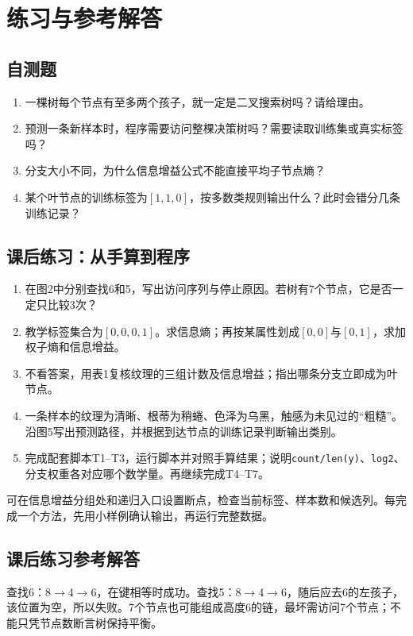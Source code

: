 \documentclass[UTF8,a4paper,11pt,fontset=fandol]{ctexart}
\numberwithin{equation}{subsection}
\begin{document}
\clearpage
\section{练习与参考解答}
\subsection{自测题}
\begin{enumerate}
\item 一棵树每个节点有至多两个孩子，就一定是二叉搜索树吗？请给理由。
\item 预测一条新样本时，程序需要访问整棵决策树吗？需要读取训练集或真实标签吗？
\item 分支大小不同，为什么信息增益公式不能直接平均子节点熵？
\item 某个叶节点的训练标签为$[1,1,0]$，按多数类规则输出什么？此时会错分几条训练记录？
\end{enumerate}

\subsection{课后练习：从手算到程序}
\begin{enumerate}
\item 在图2中分别查找6和5，写出访问序列与停止原因。若树有7个节点，它是否一定只比较3次？
\item 教学标签集合为$[0,0,0,1]$。求信息熵；再按某属性划成$[0,0]$与$[0,1]$，求加权子熵和信息增益。
\item 不看答案，用表1复核纹理的三组计数及信息增益；指出哪条分支立即成为叶节点。
\item 一条样本的纹理为清晰、根蒂为稍蜷、色泽为乌黑，触感为未见过的“粗糙”。沿图5写出预测路径，并根据到达节点的训练记录判断输出类别。
\item 完成配套脚本T1--T3，运行脚本并对照手算结果；说明\texttt{count/len(y)}、\texttt{log2}、分支权重各对应哪个数学量。再继续完成T4--T7。
\end{enumerate}
\begin{notebox}[调试建议]
可在信息增益分组处和递归入口设置断点，检查当前标签、样本数和候选列。每完成一个方法，先用小样例确认输出，再运行完整数据。
\end{notebox}

\clearpage
\subsection{课后练习参考解答}
\begin{examplebox}[练习1：查找6和5]
查找6：8$\to$4$\to$6，在键相等时成功。查找5：8$\to$4$\to$6，随后应去6的左孩子，该位置为空，所以失败。7个节点也可能组成高度6的链，最坏需访问7个节点；不能只凭节点数断言树保持平衡。
\end{examplebox}
\end{document}

